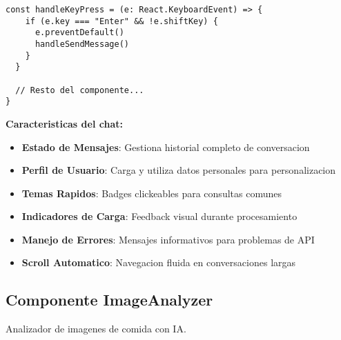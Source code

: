 \documentclass[12pt,a4paper]{article}
\begin{document}
\begin{lstlisting}[caption=components/meals/chat-interface.tsx - Estructura principal]
  const handleKeyPress = (e: React.KeyboardEvent) => {
    if (e.key === "Enter" && !e.shiftKey) {
      e.preventDefault()
      handleSendMessage()
    }
  }

  // Resto del componente...
}
\end{lstlisting}

\textbf{Caracteristicas del chat:}
\begin{itemize}
    \item \textbf{Estado de Mensajes}: Gestiona historial completo de conversacion
    \item \textbf{Perfil de Usuario}: Carga y utiliza datos personales para personalizacion
    \item \textbf{Temas Rapidos}: Badges clickeables para consultas comunes
    \item \textbf{Indicadores de Carga}: Feedback visual durante procesamiento
    \item \textbf{Manejo de Errores}: Mensajes informativos para problemas de API
    \item \textbf{Scroll Automatico}: Navegacion fluida en conversaciones largas
\end{itemize}

\subsection{Componente ImageAnalyzer}

Analizador de imagenes de comida con IA.
\end{document}
